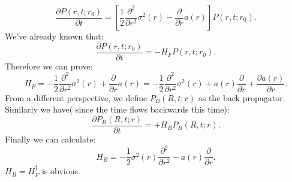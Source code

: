 \documentclass[12pt,a4paper]{paper}
\begin{document}
\begin{equation}
\frac{\partial P(r,t;r_0)}{\partial t}=[\frac{1}{2}\frac{\partial^2 }{\partial r^2}\sigma ^2(r)-\frac{\partial }{\partial r}a(r)]P(r,t;r_0).
\end {equation}
\indent We've already known that:
\begin{equation}
\frac{\partial P(r,t;r_0)}{\partial t}=-H_{F}P(r,t;r_0).
\end{equation}
Therefore we can prove:
\begin{equation}
H_{F}=-\frac{1}{2}\frac{\partial^2 }{\partial r^2}\sigma ^2(r)+\frac{\partial }{\partial r}a(r)=-\frac{1}{2}\frac{\partial^2 }{\partial r^2}\sigma ^2(r)+a(r)\frac{\partial }{\partial r}+\frac{\partial a(r)}{\partial r}.
\end{equation}
\indent From a different perspective, we define $P_{B}(R,t;r)$ as the back propagator.\\
\indent Similarly we have( since the time flows backwards this time):
\begin{equation}
\frac{\partial P_{B}(R,t;r)}{\partial t}=+H_{B}P_{B}(R,t;r).
\end{equation}
\indent Finally we can calculate:
\begin{equation}
H_{B}=-\frac{1}{2}\sigma ^2(r)\frac{\partial^2 }{\partial r^2}-a(r)\frac{\partial }{\partial r}.
\end{equation}
$H_{B}=H_{F}^{\dag}$ is obvious.
\end{document}
